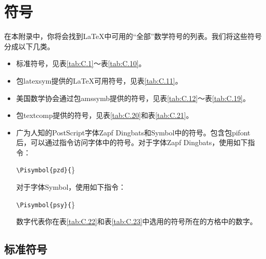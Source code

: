 \chapter{符号}

在本附录中，你将会找到\LaTeX 中可用的“全部”数学符号的列表。我们将这些符号分成以下几类。

\begin{itemize}
    \item 标准符号，见表\ref{tab:C.1}～表\ref{tab:C.10}。
    \item 包\textsf{latexsym}提供的\LaTeX 可用符号，见表\ref{tab:C.11}。
    \item 美国数学协会通过包\textsf{amssymb}提供的符号，见表\ref{tab:C.12}～表\ref{tab:C.19}。
    \item 包\textsf{textcomp}提供的符号，见表\ref{tab:C.20}和表\ref{tab:C.21}。
    \item 广为人知的PostScript字体Zapf Dingbats和Symbol中的符号。包含包\textsf{pifont}后，可以通过指令访问字体中的符号。对于字体Zapf Dingbats，使用如下指令：
    
    \begin{dmd}
\verb+\Pisymbol{pzd}{+\}
    \end{dmd}

    对于字体Symbol，使用如下指令：

    \begin{dmd}
\verb+\Pisymbol{psy}{+\}
    \end{dmd}
    
    数字代表你在表\ref{tab:C.22}和表\ref{tab:C.23}中选用的符号所在的方格中的数字。
\end{itemize}

\newcommand{\ms}[1]{\dm{\backslash #1} & $\csname#1\endcsname$}
\newcommand{\msdel}[1]{\dm{\backslash #1} & $\left\csname#1\endcsname\right.$}

\section{标准符号}

